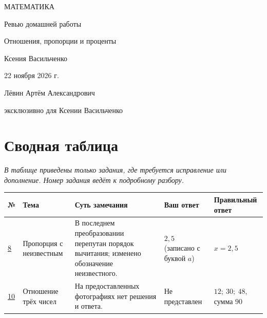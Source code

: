 \documentclass[a4paper,12pt]{article}
\begin{document}
\thispagestyle{empty}
\begin{center}
  \vspace*{2.5cm}
  {\color{darkaccent}\large МАТЕМАТИКА\par}
  \vspace{2.1cm}
  {\Huge Ревью домашней работы\par}
  \vspace{1.2cm}
  {\LARGE\color{accent} Отношения, пропорции и проценты\par}
  \vspace{2.0cm}
  {\large Ксения Васильченко\par}
  \vspace{1.0cm}
  {\large 22 ноября 2026 г.\par}
  \vfill
  {\small Лёвин Артём Александрович\par}
  \vspace{0.18cm}
  {\small эксклюзивно для Ксении Васильченко\par}
  \vspace{1.35cm}
  \vspace{0.35cm}
\end{center}
\newpage

\section*{Сводная таблица}
\textit{В таблице приведены только задания, где требуется исправление или дополнение. Номер задания ведёт к подробному разбору.}

\smallskip
\begingroup\small
\begin{tabularx}{\linewidth}{@{}>{\centering\arraybackslash}p{11mm}p{29mm}X>{\raggedright\arraybackslash}p{28mm}>{\raggedright\arraybackslash}p{26mm}@{}}
\toprule
№ & Тема & Суть замечания & Ваш ответ & Правильный ответ \\
\midrule
\hyperref[task:8]{8} & Пропорция с неизвестным & В последнем преобразовании перепутан порядок вычитания; изменено обозначение неизвестного. & $2{,}5$ (записано с буквой $a$) & $x=2{,}5$ \\
\addlinespace[5pt]
\hyperref[task:10]{10} & Отношение трёх чисел & На предоставленных фотографиях нет решения и ответа. & Не представлен & $12;\ 30;\ 48$, сумма $90$ \\
\bottomrule
\end{tabularx}
\endgroup
\end{document}
